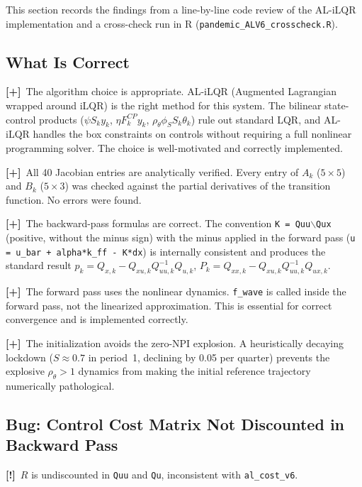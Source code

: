 \documentclass[12pt, a4paper]{article}
\newcommand{\strength}[1]{\textcolor{strength}{\textbf{[+]}~#1}}
\newcommand{\concern}[1]{\textcolor{concern}{\textbf{[!]}~#1}}
\begin{document}
This section records the findings from a line-by-line code review of the
AL-iLQR implementation and a cross-check run in R (\texttt{pandemic\_ALV6\_crosscheck.R}).

\subsection{What Is Correct}

\strength{The algorithm choice is appropriate.} AL-iLQR (Augmented Lagrangian wrapped
around iLQR) is the right method for this system. The bilinear state-control products
($\psi S_k y_k$, $\eta F_k^{CP} y_k$, $\rho_\theta \phi_S S_k \theta_k$) rule out
standard LQR, and AL-iLQR handles the box constraints on controls without requiring a
full nonlinear programming solver. The choice is well-motivated and correctly implemented.

\strength{All 40 Jacobian entries are analytically verified.} Every entry of $A_k$
($5\times5$) and $B_k$ ($5\times3$) was checked against the partial derivatives of the
transition function. No errors were found.

\strength{The backward-pass formulas are correct.} The convention
\texttt{K = Quu$\backslash$Qux} (positive, without the minus sign) with the minus applied
in the forward pass (\texttt{u = u\_bar + alpha*k\_ff - K*dx}) is internally consistent
and produces the standard result $p_k = Q_{x,k} - Q_{xu,k} Q_{uu,k}^{-1} Q_{u,k}$,
$P_k = Q_{xx,k} - Q_{xu,k} Q_{uu,k}^{-1} Q_{ux,k}$.

\strength{The forward pass uses the nonlinear dynamics.} \texttt{f\_wave} is called
inside the forward pass, not the linearized approximation. This is essential for
correct convergence and is implemented correctly.

\strength{The initialization avoids the zero-NPI explosion.} A heuristically decaying
lockdown ($S \approx 0.7$ in period~1, declining by 0.05 per quarter) prevents the
explosive $\rho_\theta > 1$ dynamics from making the initial reference trajectory
numerically pathological.

\subsection{Bug: Control Cost Matrix Not Discounted in Backward Pass}

\concern{$R$ is undiscounted in \texttt{Quu} and \texttt{Qu}, inconsistent with
\texttt{al\_cost\_v6}.}
\end{document}
